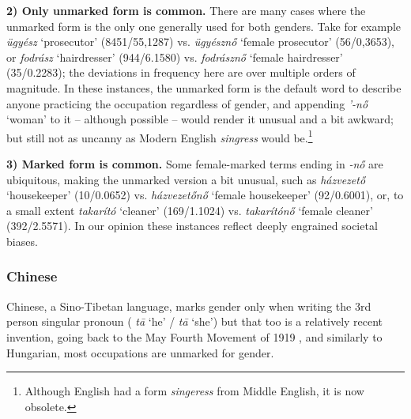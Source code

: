 \documentclass[11pt]{article}
\newcommand{\zh}[1]{\simplifiedchinesefont{#1}\rmfamily}
\begin{document}
\textbf{2) Only unmarked form is common.} There are many cases where the unmarked form is the only one generally used for both genders. Take for example \textit{ügyész} `prosecutor' (8451/55,1287) vs. \textit{ügyésznő} `female prosecutor' (56/0,3653), or \textit{fodrász} `hairdresser' (944/6.1580) vs. \textit{fodrásznő} `female hairdresser' (35/0.2283); the deviations in frequency here are over multiple orders of magnitude. In these instances, the unmarked form is the default word to describe anyone practicing the occupation regardless of gender, and appending \textit{'-nő} `woman' to it -- although possible -- would render it unusual and a bit awkward; but still not as uncanny as Modern English \textit{singress} would be.\footnote{Although English had a form \textit{singeress} from Middle English, it is now obsolete.}

\textbf{3) Marked form is common.} Some female-marked terms ending in \textit{-nő} are ubiquitous, making the unmarked version a bit unusual, such as \textit{házvezető} `housekeeper' (10/0.0652) vs. \textit{házvezetőnő} `female housekeeper' (92/0.6001), or, to a small extent \textit{takarító} `cleaner' (169/1.1024) vs. \textit{takarítónő} `female cleaner' (392/2.5571). In our opinion these instances reflect deeply engrained societal biases.

\subsubsection{Chinese}

Chinese, a Sino-Tibetan language, marks gender only when writing the 3rd person singular pronoun (\zh{他} \textit{tā} `he' / \zh{她} \textit{tā} `she') but that too is a relatively recent invention, going back to the May Fourth Movement of 1919 \citep{bi_2013_tazi}, and similarly to Hungarian, most occupations are unmarked for gender.

\end{document}
